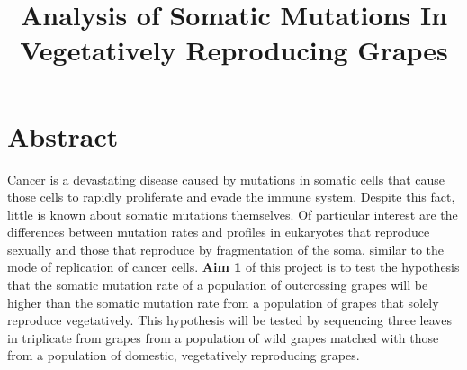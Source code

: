 \documentclass[12pt]{article}
\title{Analysis of Somatic Mutations In Vegetatively Reproducing Grapes}
\date{}
\begin{document}
\maketitle





\section{Abstract}
Cancer is a devastating disease caused by mutations in somatic cells that cause those cells to rapidly proliferate and evade the immune system. Despite this fact, little is known about somatic mutations themselves. Of particular interest are the differences between mutation rates and profiles in eukaryotes that reproduce sexually and those that reproduce by fragmentation of the soma, similar to the mode of replication of cancer cells.
\textbf{Aim 1} of this project is to test the hypothesis that the somatic mutation rate of a population of outcrossing grapes will be higher than the somatic mutation rate from a population of grapes that solely reproduce vegetatively. This hypothesis will be tested by sequencing three leaves in triplicate from grapes from a population of wild grapes matched with those from a population of domestic, vegetatively reproducing grapes. 
\end{document}
